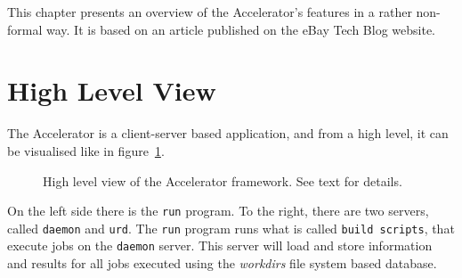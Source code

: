 

This chapter presents an overview of the Accelerator's features in a
rather non-formal way.  It is based on an article published on the
eBay Tech Blog website.



\section{High Level View}
The Accelerator is a client-server based application, and from a high
level, it can be visualised like in figure~\ref{fig:overview}.
\begin{figure}[h!]
  \begin{center}
    
    \caption{High level view of the Accelerator framework.  See text
      for details.}
    \label{fig:overview}
  \end{center}
\end{figure}

On the left side there is the \texttt{run} program.  To the right, there
are two servers, called \texttt{daemon} and \texttt{urd}.  The
\texttt{run} program runs what is called \texttt{build scripts}, that
execute jobs on the \texttt{daemon} server.  This server will load and
store information and results for all jobs executed using the
\textsl{workdirs} file system based database.

